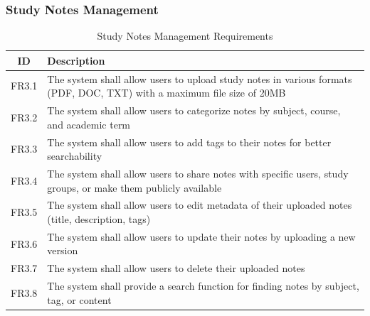 \documentclass{article}
\begin{document}
\subsubsection{Study Notes Management}
\begin{table}[h!]
\centering
\begin{tabular}{|c|p{10cm}|}
\hline
\textbf{ID} & \textbf{Description} \\
\hline
FR3.1 & The system shall allow users to upload study notes in various formats (PDF, DOC, TXT) with a maximum file size of 20MB \\
FR3.2 & The system shall allow users to categorize notes by subject, course, and academic term \\
FR3.3 & The system shall allow users to add tags to their notes for better searchability \\
FR3.4 & The system shall allow users to share notes with specific users, study groups, or make them publicly available \\
FR3.5 & The system shall allow users to edit metadata of their uploaded notes (title, description, tags) \\
FR3.6 & The system shall allow users to update their notes by uploading a new version \\
FR3.7 & The system shall allow users to delete their uploaded notes \\
FR3.8 & The system shall provide a search function for finding notes by subject, tag, or content \\
\hline
\end{tabular}
\caption{Study Notes Management Requirements}
\label{tab: study_notes_management}
\end{table}
\end{document}
